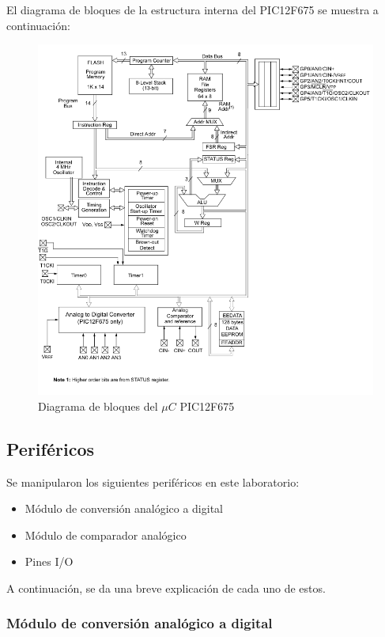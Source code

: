 El diagrama de bloques de la estructura interna del PIC12F675 se muestra a continuación:
\vfill
\begin{figure}[!h]
    \centering
    \includegraphics[width = \linewidth]{imagenes/fig2.png}
    \caption{Diagrama de bloques del $\mu C$ PIC12F675}
    \label{fig2}
\end{figure}
\vfill
\newpage
\subsection{Periféricos}

Se manipularon los siguientes periféricos en este laboratorio:

\begin{itemize}
    \item Módulo de conversión analógico a digital
    \item Módulo de comparador analógico
    \item Pines I/O
\end{itemize}

A continuación, se da una breve explicación de cada uno de estos.

\subsubsection{Módulo de conversión analógico a digital}


